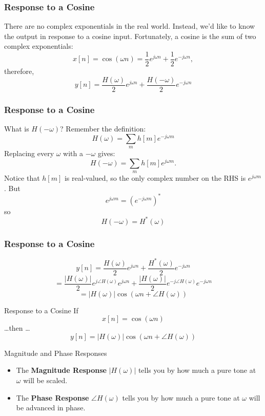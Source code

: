 \documentclass{beamer}
\begin{document}
\begin{frame}
  \frametitle{Response to a Cosine}
  There are no  complex exponentials in the real world.  Instead, we'd like to know
  the output in response to a cosine input.  Fortunately, a cosine
  is the sum of two complex exponentials:
  \[
  x[n] = \cos(\omega n) = \frac{1}{2}e^{j\omega n}+\frac{1}{2}e^{-j\omega n},
  \]
  therefore,
  \[
  y[n] = \frac{H(\omega)}{2}e^{j\omega n}+\frac{H(-\omega)}{2}e^{-j\omega n}
  \]
\end{frame}


\begin{frame}
  \frametitle{Response to a Cosine}
  What is $H(-\omega)$?  Remember the definition:
  \[
  H(\omega) = \sum_m h[m] e^{-j\omega m}
  \]
  Replacing every $\omega$ with a  $-\omega$ gives:
  \[
  H(-\omega) = \sum_m h[m] e^{j\omega m}.
  \]
  Notice that $h[m]$ is real-valued, so the only complex number on the RHS  is $e^{j\omega m}$.  But
  \[
  e^{j\omega m}=\left(e^{-j\omega m}\right)^*
  \]
  so
  \[
  H(-\omega) = H^*(\omega)
  \]
\end{frame}

\begin{frame}
  \frametitle{Response to a Cosine}
  \[
  y[n] = \frac{H(\omega)}{2}e^{j\omega n}+\frac{H^*(\omega)}{2}e^{-j\omega n}
  \]
  \[
  = \frac{|H(\omega)|}{2}e^{j\angle H(\omega)}e^{j\omega n} + 
  \frac{|H(\omega)|}{2}e^{-j\angle H(\omega)}e^{-j\omega n}
  \]
  \[
  = |H(\omega)|\cos\left(\omega n+\angle H(\omega)\right)
  \]
\end{frame}


\begin{frame}
  \begin{block}{Response to a Cosine}
    If
    \[
    x[n] = \cos(\omega n)
    \]
    \ldots then \ldots
    \[
    y[n] = |H(\omega)|\cos\left(\omega n+\angle H(\omega)\right)
    \]
  \end{block}
  \begin{block}{Magnitude and Phase Responses}
    \begin{itemize}
    \item The {\bf Magnitude Response} $|H(\omega)|$ tells you by how
      much a pure tone at $\omega$ will be scaled.
    \item The {\bf Phase Response} $\angle H(\omega)$ tells you by how much
      a pure tone at $\omega$ will be advanced in phase.
    \end{itemize}
  \end{block}
\end{frame}
\end{document}
